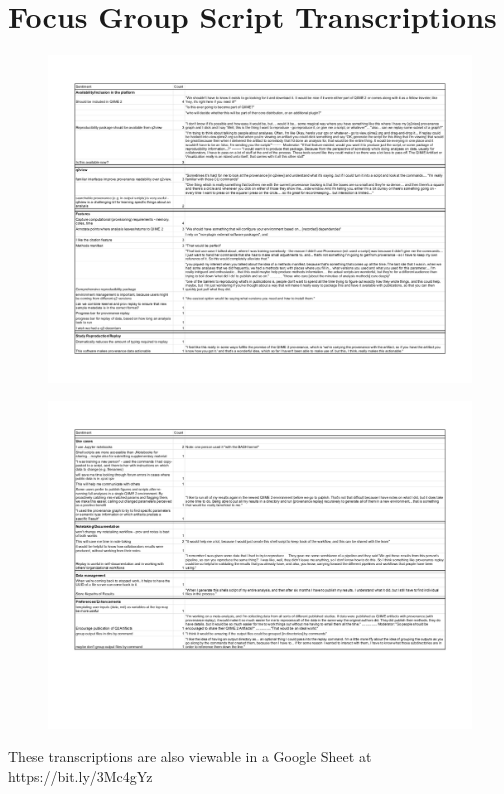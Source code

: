 \chapter{Focus Group Script Transcriptions}
\label{app:FGTranscripts}

\begin{figure}[htp]
\centering
\includegraphics[width=\textwidth]{figures/fg_transcript_1.jpg}
\end{figure}

\begin{figure}[htp]
\centering
\includegraphics[width=\textwidth]{figures/fg_transcript_2.jpg}
\end{figure}

These transcriptions are also viewable in a Google Sheet at https://bit.ly/3Mc4gYz
